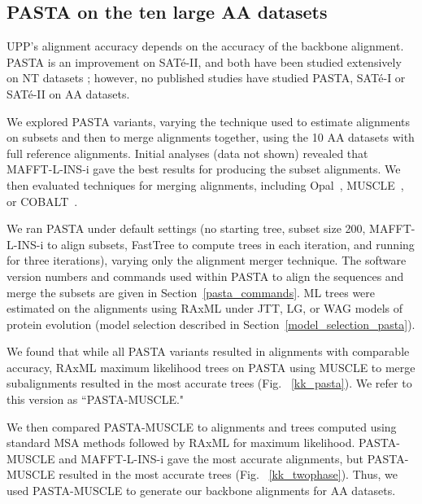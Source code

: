 \clearpage

\subsection{PASTA on the ten large AA datasets}\label{pasta_protein}
UPP's alignment accuracy depends on the accuracy of the backbone alignment.  
PASTA is an improvement on SAT\'e-II, and both have
been  studied extensively on NT datasets \cite{PASTA}; however, 
no published studies have studied PASTA, SAT\'e-I or SAT\'e-II on AA datasets.  


We explored PASTA variants, varying the technique used to estimate alignments on
subsets and then to merge alignments together, using the 10 AA datasets with full
reference alignments.
Initial analyses (data not shown) revealed that MAFFT-L-INS-i gave the best results
for producing the subset alignments.
We then evaluated techniques for merging alignments, including
Opal~\cite{Wheeler2007}, MUSCLE~\cite{Edgar2004}, or COBALT~\cite{Papadopoulos2007}.

We ran PASTA under default settings (no starting tree, subset size 200, MAFFT-L-INS-i
to align subsets, FastTree to compute trees in each
iteration, and running for three iterations), varying only the
alignment merger technique.
The software version numbers and commands used within PASTA to align the sequences and merge the subsets are given in Section~\ref{pasta_commands}.  ML trees were estimated on the alignments using RAxML under JTT, LG, or WAG models of protein evolution (model selection described in Section~\ref{model_selection_pasta}).

We found that while all PASTA variants resulted in alignments with  comparable accuracy, 
RAxML maximum likelihood trees on PASTA using MUSCLE to merge subalignments 
resulted in the most accurate trees (Fig. ~\ref{kk_pasta}).  
We refer to this version as ``PASTA-MUSCLE."

We then compared PASTA-MUSCLE to alignments and trees computed using
standard MSA methods followed by RAxML for maximum likelihood.
PASTA-MUSCLE and MAFFT-L-INS-i gave the most accurate alignments, 
but PASTA-MUSCLE resulted in the most accurate trees (Fig. ~\ref{kk_twophase}).  Thus, we used PASTA-MUSCLE to generate our backbone alignments for AA datasets.



